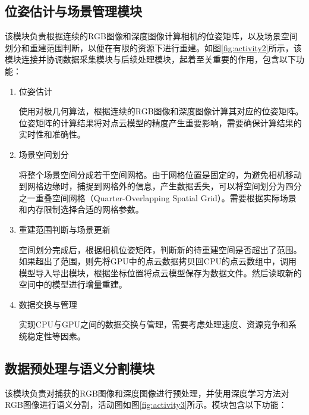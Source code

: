 \subsection{位姿估计与场景管理模块}
\par 该模块负责根据连续的RGB图像和深度图像计算相机的位姿矩阵，以及场景空间划分和重建范围判断，以便在有限的资源下进行重建。如图\ref{fig:activity2}所示，该模块连接并协调数据采集模块与后续处理模块，起着至关重要的作用，包含以下功能：
\begin{enumerate}
	\item{位姿估计}
	\par 使用对极几何算法，根据连续的RGB图像和深度图像计算其对应的位姿矩阵。位姿矩阵的计算结果将对点云模型的精度产生重要影响，需要确保计算结果的实时性和准确性。

	\item{场景空间划分}
	\par 将整个场景空间分成若干空间网格。由于网格位置是固定的，为避免相机移动到网格边缘时，捕捉到网格外的信息，产生数据丢失，可以将空间划分为四分之一重叠空间网格（Quarter-Overlapping Spatial Grid）\cite{CompressibleLES}。需要根据实际场景和内存限制选择合适的网格参数。

	\item{重建范围判断与场景更新}
	\par 空间划分完成后，根据相机位姿矩阵，判断新的待重建空间是否超出了范围。如果超出了范围，则先将GPU中的点云数据拷贝回CPU的点云数组中，调用模型导入导出模块，根据坐标位置将点云模型保存为数据文件。然后读取新的空间中的模型进行增量重建。

	\item{数据交换与管理}
	\par 实现CPU与GPU之间的数据交换与管理，需要考虑处理速度、资源竞争和系统稳定性等因素。
\end{enumerate}

\subsection{数据预处理与语义分割模块}
\par 该模块负责对捕获的RGB图像和深度图像进行预处理，并使用深度学习方法对RGB图像进行语义分割，活动图如图\ref{fig:activity3}所示。模块包含以下功能：

